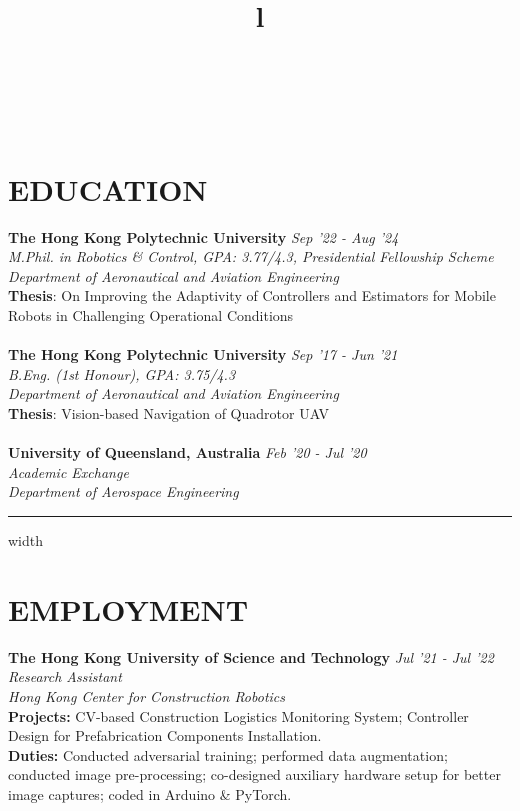 \documentclass[overlapped]{res}
\begin{document}
\begin{resume}

\begin{format}
  \title{l}\\
  \body\\
\end{format}

\section{EDUCATION}
\textbf{The Hong Kong Polytechnic University} \hfill \textit{Sep '22 - Aug '24}\\
{\sl M.Phil. in Robotics \& Control, GPA: 3.77/4.3, Presidential Fellowship Scheme \\ 
Department of Aeronautical and Aviation Engineering}\\ 
\textbf{Thesis}: On Improving the Adaptivity of Controllers and Estimators for Mobile Robots in Challenging Operational Conditions
\\ \\ 
\textbf{The Hong Kong Polytechnic University} \hfill \textit{Sep '17 - Jun '21}\\
{\sl B.Eng. (1st Honour), GPA: 3.75/4.3\\ 
Department of Aeronautical and Aviation Engineering}\\ 
\textbf{Thesis}: Vision-based Navigation of Quadrotor UAV
\\ \\ 
\textbf{University of Queensland, Australia} \hfill \textit{Feb '20 - Jul '20}\\
{\sl Academic Exchange \\ 
Department of Aerospace Engineering}
\par\noindent\hrule width \linewidth %

\section{EMPLOYMENT}
\textbf{The Hong Kong University of Science and Technology} \hfill \textit{Jul '21 - Jul '22}\\
{\sl Research Assistant\\
Hong Kong Center for Construction Robotics}\\ 
\textbf{Projects:} CV-based Construction Logistics Monitoring System; Controller Design for Prefabrication Components Installation.\\
\textbf{Duties:} Conducted adversarial training; performed data augmentation; conducted image pre-processing; co-designed auxiliary hardware setup for better image captures; coded in Arduino \& PyTorch.


\end{resume}
\end{document}
